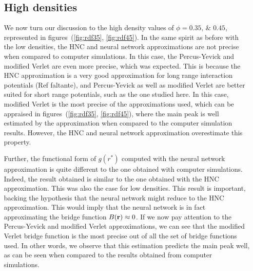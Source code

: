 \subsection{High densities}
We now turn our discussion to the high density values of
$\phi=\numlist[list-pair-separator={\enspace\text{and}\enspace}]{0.35; 0.45}$,
represented in figures~(\ref{fig:rdf35}, \ref{fig:rdf45}).
In the same spirit as before with the low densities, the HNC and neural network 
approximations are not precise when compared to computer simulations. In this case,
the Percus-Yevick and modified Verlet are even more precise, which was expected.
This is because the HNC approximation is a very good approximation for long range
interaction potentials (Ref faltante), and Percus-Yevick as well as modified Verlet are 
better suited for short range potentials, such as the one studied here.
In this case, modified Verlet is the most precise of the approximations used, which
can be appraised in figures~(\ref{fig:rdf35}, \ref{fig:rdf45}), where the 
main peak is well estimated by the approximation when compared to the computer simulation
results. However, the HNC and neural network approximation overestimate this property.

Further, the functional form of $g(r^*)$ computed with the neural network approximation 
is quite different to the one obtained with computer simulations. Indeed, the result
obtained is similar to the one obtained with the HNC approximation. This was also the
case for low densities. This result is important, backing the hypothesis that the
neural network might reduce to the HNC approximation.
This would imply that the neural network is in fact approximating the bridge function
$B(\mathbf{r}) \approx 0$. If we now pay attention to the Percus-Yevick and modified Verlet
approximations, we can see that the modified Verlet bridge function is the most precise
out of all the set of bridge functions used. In other words, we observe that this
estimation predicts the main peak well, as can be seen when compared to the results
obtained from computer simulations.

